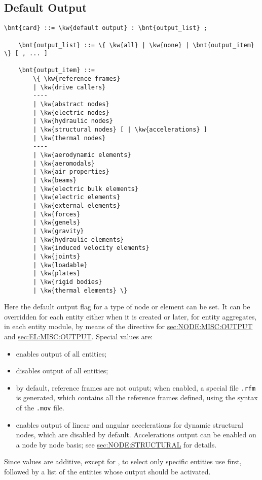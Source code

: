 \subsection{Default Output}\label{sec:CONTROLDATA:DEFAULTOUTPUT}
\begin{Verbatim}[commandchars=\\\{\}]
    \bnt{card} ::= \kw{default output} : \bnt{output_list} ;

    \bnt{output_list} ::= \{ \kw{all} | \kw{none} | \bnt{output_item} \} [ , ... ]

    \bnt{output_item} ::=
        \{ \kw{reference frames}
        | \kw{drive callers}
        ----
        | \kw{abstract nodes}
        | \kw{electric nodes}
        | \kw{hydraulic nodes}
        | \kw{structural nodes} [ | \kw{accelerations} ]
        | \kw{thermal nodes}
        ----
        | \kw{aerodynamic elements}
        | \kw{aeromodals}
        | \kw{air properties}
        | \kw{beams}
        | \kw{electric bulk elements}
        | \kw{electric elements}
        | \kw{external elements}
        | \kw{forces}
        | \kw{genels}
        | \kw{gravity}
        | \kw{hydraulic elements}
        | \kw{induced velocity elements}
        | \kw{joints}
        | \kw{loadable}
        | \kw{plates}
        | \kw{rigid bodies}
        | \kw{thermal elements} \}
\end{Verbatim}
Here the default output flag for a type of node or element can be set.
It can be overridden for each entity either when it is created or later,
for entity aggregates, in each entity module, by means of the 
directive for 
\hyperref{\kw{nodes}}{\kw{nodes} (see Section~}{)}{sec:NODE:MISC:OUTPUT}
and 
\hyperref{\kw{elements}}{\kw{elements} (see Section~}{)}{sec:EL:MISC:OUTPUT}.
Special values are:
\begin{itemize}
\item {} enables output of all entities;
\item {} disables output of all entities;
\item {} by default, reference frames are not output;
when enabled, a special file \texttt{.rfm} is generated, which contains
all the reference frames defined, using the syntax of the \texttt{.mov} file.
\item {} enables output of linear and angular accelerations
for dynamic structural nodes, which are disabled by default.
Accelerations output can be enabled on a node by node basis;
see 
\hyperref{\kw{structural node}}{\kw{structural node} (see Section~}{)}{sec:NODE:STRUCTURAL}
for details.
\end{itemize}
Since values are additive, except for , to select 
only specific entities use  first, followed by a list
of the entities whose output should be activated.

